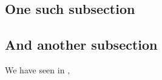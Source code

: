 %

\lipsum[4]

\subsection{One such subsection}

\lipsum[5-8]

\subsection{And another subsection}

We have seen in \cite{bergsma2017}, \lipsum[9]

%
%
%















